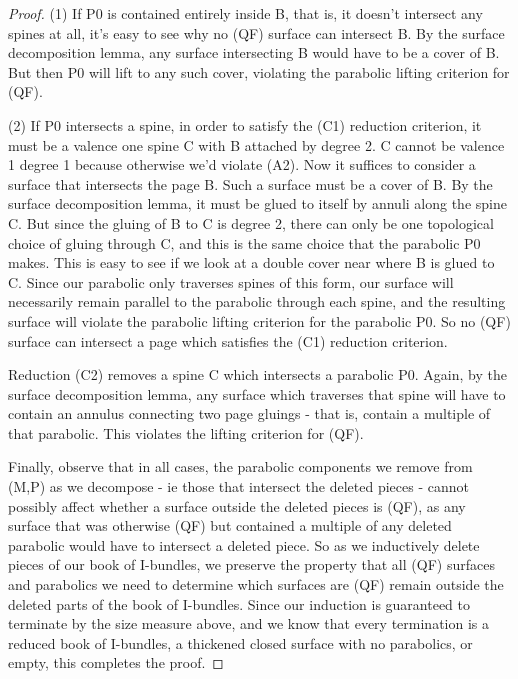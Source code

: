 \begin{proof}
(1) If P0 is contained entirely inside B, that is, it doesn't intersect any
spines at all, it's easy to see why no (QF) surface can intersect B. By the
surface decomposition lemma, any surface intersecting B would have to be
a cover of B. But then P0 will lift to any such cover, violating the parabolic
lifting criterion for (QF).

(2) If P0 intersects a spine, in order to satisfy the (C1) reduction criterion,
it must be a valence one spine C with B attached by degree 2. C cannot be
valence 1 degree 1 because otherwise we'd violate (A2). Now it suffices to
consider a surface that intersects the page B. Such a surface must be a cover
of B. By the surface decomposition lemma, it must be glued to itself by annuli
along the spine C. But since the gluing of B to C is degree 2, there can only
be one topological choice of gluing through C, and this is the same choice that
the parabolic P0 makes. This is easy to see if we look at a double cover near
where B is glued to C. Since our parabolic only traverses spines of this form,
our surface will necessarily remain parallel to the parabolic through each
spine, and the resulting surface will violate the parabolic lifting criterion
for the parabolic P0. So no (QF) surface can intersect a page which satisfies
the (C1) reduction criterion.

Reduction (C2) removes a spine C which intersects a parabolic P0. Again, by the
surface decomposition lemma, any surface which traverses that spine will have
to contain an annulus connecting two page gluings - that is, contain a multiple
of that parabolic. This violates the lifting criterion for (QF).

Finally, observe that in all cases, the parabolic components we remove from
(M,P) as we decompose - ie those that intersect the deleted pieces - cannot
possibly affect whether a surface outside the deleted pieces is (QF), as any
surface that was otherwise (QF) but contained a multiple of any deleted
parabolic would have to intersect a deleted piece. So as we inductively delete
pieces of our book of I-bundles, we preserve the property that all (QF)
surfaces and parabolics we need to determine which surfaces are (QF) remain
outside the deleted parts of the book of I-bundles. Since our induction is
guaranteed to terminate by the size measure above, and we know that every
termination is a reduced book of I-bundles, a thickened closed surface with no
parabolics, or empty, this completes the proof.

\end{proof}

